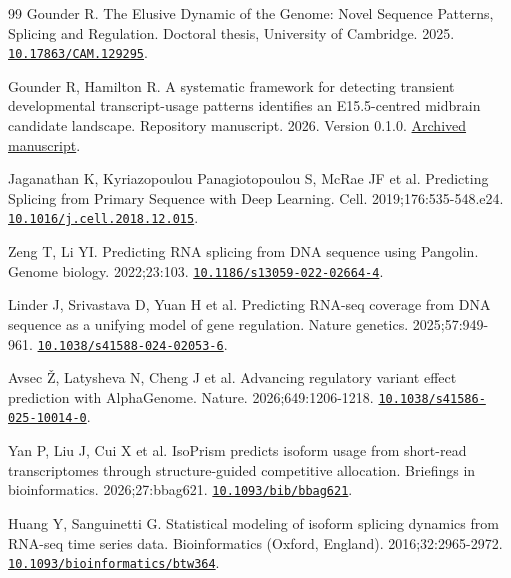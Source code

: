\documentclass[11pt,a4paper]{article}
\begin{document}
\begin{thebibliography}{99}
Gounder R. The Elusive Dynamic of the Genome: Novel Sequence Patterns, Splicing and Regulation. Doctoral thesis, University of Cambridge. 2025. \href{https://doi.org/10.17863/CAM.129295}{\nolinkurl{10.17863/CAM.129295}}.

Gounder R, Hamilton R. A systematic framework for detecting transient developmental transcript-usage patterns identifies an E15.5-centred midbrain candidate landscape. Repository manuscript. 2026. Version 0.1.0. \href{https://github.com/Kohze/developmental-dtu-patterns/blob/8d84703f225d64596ee6958661e0ffc9266661af/manuscript.pdf}{Archived manuscript}.

Jaganathan K, Kyriazopoulou Panagiotopoulou S, McRae JF et al. Predicting Splicing from Primary Sequence with Deep Learning. Cell. 2019;176:535-548.e24. \href{https://doi.org/10.1016/j.cell.2018.12.015}{\nolinkurl{10.1016/j.cell.2018.12.015}}.

Zeng T, Li YI. Predicting RNA splicing from DNA sequence using Pangolin. Genome biology. 2022;23:103. \href{https://doi.org/10.1186/s13059-022-02664-4}{\nolinkurl{10.1186/s13059-022-02664-4}}.

Linder J, Srivastava D, Yuan H et al. Predicting RNA-seq coverage from DNA sequence as a unifying model of gene regulation. Nature genetics. 2025;57:949-961. \href{https://doi.org/10.1038/s41588-024-02053-6}{\nolinkurl{10.1038/s41588-024-02053-6}}.

Avsec \v{Z}, Latysheva N, Cheng J et al. Advancing regulatory variant effect prediction with AlphaGenome. Nature. 2026;649:1206-1218. \href{https://doi.org/10.1038/s41586-025-10014-0}{\nolinkurl{10.1038/s41586-025-10014-0}}.

Yan P, Liu J, Cui X et al. IsoPrism predicts isoform usage from short-read transcriptomes through structure-guided competitive allocation. Briefings in bioinformatics. 2026;27:bbag621. \href{https://doi.org/10.1093/bib/bbag621}{\nolinkurl{10.1093/bib/bbag621}}.

Huang Y, Sanguinetti G. Statistical modeling of isoform splicing dynamics from RNA-seq time series data. Bioinformatics (Oxford, England). 2016;32:2965-2972. \href{https://doi.org/10.1093/bioinformatics/btw364}{\nolinkurl{10.1093/bioinformatics/btw364}}.

\end{thebibliography}
\end{document}
